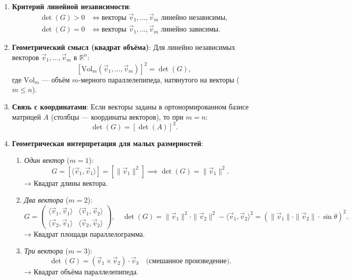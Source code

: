 \documentclass[12pt]{article}
\begin{document}
\begin{enumerate}
    \item \textbf{Критерий линейной независимости}:  
    $$
    \begin{aligned}
    \det(G) > 0 &\iff \text{векторы } \vec{v}_1, \dots, \vec{v}_m \text{ линейно независимы}, \\
    \det(G) = 0 &\iff \text{векторы } \vec{v}_1, \dots, \vec{v}_m \text{ линейно зависимы}.
    \end{aligned}
    $$
    \item \textbf{Геометрический смысл (квадрат объёма)}:  
    Для линейно независимых векторов $\vec{v}_1, \dots, \vec{v}_m$ в $\mathbb{R}^n$:  
    $$
    [\mathrm{Vol}_m(\vec{v}_1, \dots, \vec{v}_m)]^2 = \det(G),
    $$  
    где $\mathrm{Vol}_m$ — объём $m$-мерного параллелепипеда, натянутого на векторы ($m \leq n$).
    \item \textbf{Связь с координатами}:  
    Если векторы заданы в ортонормированном базисе матрицей $A$ (столбцы — координаты векторов), то при $m = n$:  
    $$
    \det(G) = [\det(A)]^2.
    $$
    \item \textbf{Геометрическая интерпретация для малых размерностей}:
    \begin{enumerate}
        \item \textit{Один вектор} ($m = 1$):  
        $$
        G = [\langle \vec{v}_1, \vec{v}_1 \rangle] = [\|\vec{v}_1\|^2] \implies \det(G) = \|\vec{v}_1\|^2.
        $$  
        → Квадрат длины вектора.
        \item \textit{Два вектора} ($m = 2$):  
        $$
        G = 
        \begin{pmatrix}
        \langle \vec{v}_1, \vec{v}_1 \rangle & \langle \vec{v}_1, \vec{v}_2 \rangle \\
        \langle \vec{v}_2, \vec{v}_1 \rangle & \langle \vec{v}_2, \vec{v}_2 \rangle
        \end{pmatrix}, \quad
        \det(G) = \|\vec{v}_1\|^2 \cdot \|\vec{v}_2\|^2 - \langle \vec{v}_1, \vec{v}_2 \rangle^2 = (\|\vec{v}_1\| \cdot \|\vec{v}_2\| \cdot \sin \theta)^2.
        $$  
        → Квадрат площади параллелограмма.
        \item \textit{Три вектора} ($m = 3$):  
        $$
        \det(G) = (\vec{v}_1 \times \vec{v}_2) \cdot \vec{v}_3 \quad \text{(смешанное произведение)}.
        $$  
        → Квадрат объёма параллелепипеда.
    \end{enumerate}
\end{enumerate}
        
\end{document}
